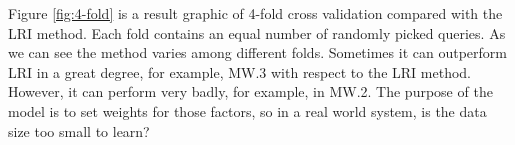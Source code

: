 Figure \ref{fig:4-fold} is a result graphic of 4-fold cross validation compared with the LRI method. Each fold contains an equal number of randomly picked queries. As we can see the method varies among different folds. Sometimes it can outperform LRI in a great degree, for example, MW.3 with respect to the LRI method. However, it can perform very badly, for example, in MW.2. The purpose of the model is to set weights for those factors, so in a real world system, is the data size too small to learn?

